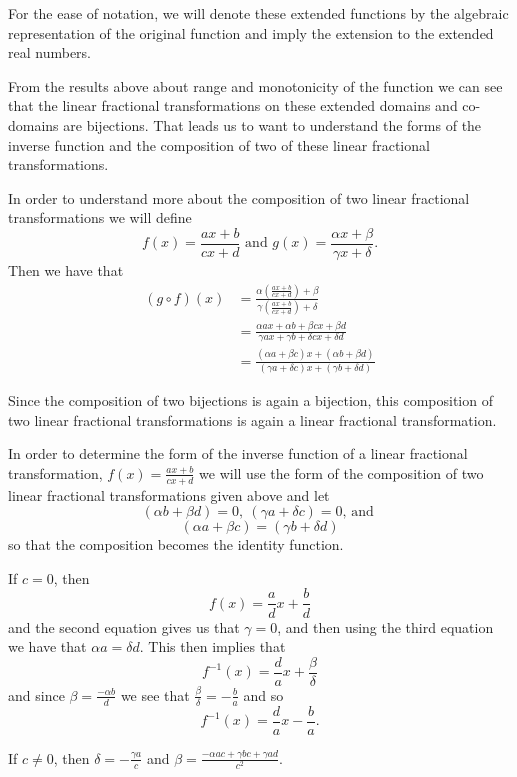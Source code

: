 \documentclass[
]{book}
\theoremstyle{definition}
\theoremstyle{definition}
\theoremstyle{definition}
\theoremstyle{remark}
\begin{document}
For the ease of notation, we will denote these extended functions by the algebraic representation of the original function and imply the extension to the extended real numbers.

From the results above about range and monotonicity of the function we can see that the linear fractional transformations on these extended domains and co-domains are bijections. That leads us to want to understand the forms of the inverse function and the composition of two of these linear fractional transformations.

In order to understand more about the composition of two linear fractional transformations we will define
\[f(x)=\frac{ax+b}{cx+d} \mbox{ and } g(x)=\frac{\alpha x + \beta}{\gamma x + \delta}.\]
Then we have that
\begin{align*}
    (g\circ f) (x) & = \frac{\alpha \left(\frac{ax+b}{cx+d}\right) + \beta}{\gamma \left( \frac{ax+b}{cx+d}\right) + \delta } \\
    & = \frac{ \alpha a x + \alpha b + \beta cx+ \beta d}{\gamma a x + \gamma b + \delta cx + \delta d} \\
    & = \frac{ \left(\alpha a + \beta c\right) x + \left(\alpha b + \beta d\right)}{\left(\gamma a + \delta c\right)x+\left(\gamma b + \delta d\right)} 
\end{align*}

Since the composition of two bijections is again a bijection, this composition of two linear fractional transformations is again a linear fractional transformation.

In order to determine the form of the inverse function of a linear fractional transformation, \(f(x)=\frac{ax+b}{cx+d}\) we will use the form of the composition of two linear fractional transformations given above and let \[(\alpha b+\beta d)=0, \: (\gamma a + \delta c)=0\mbox{, and }\] \[(\alpha a + \beta c) = (\gamma b+\delta d)\] so that the composition becomes the identity function.

If \(c=0\), then \[f(x)= \frac{a}{d} x + \frac{b}{d}\] and the second equation gives us that \(\gamma =0\), and then using the third equation we have that \(\alpha a = \delta d\). This then implies that \[f^{-1}(x)= \frac{d}{a} x +  \frac{\beta}{\delta}\] and since \(\beta = \frac{-\alpha b}{d}\) we see that \(\frac{\beta}{\delta} = -\frac{b}{a}\) and so \[f^{-1}(x)= \frac{d}{a} x - \frac{b}{a}.\]

If \(c\neq 0\), then \(\delta = -\frac{\gamma a}{c}\) and \(\beta = \frac{-\alpha ac + \gamma bc + \gamma a d}{c^2}\).
\end{document}
